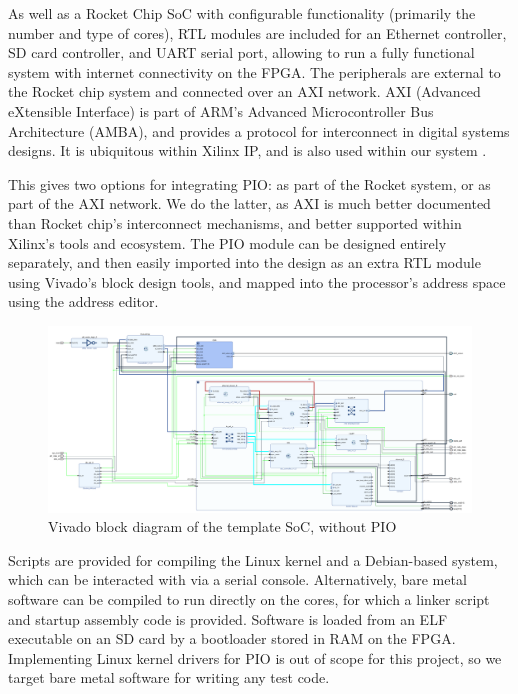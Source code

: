 As well as a Rocket Chip SoC with configurable functionality (primarily the number and type of cores), RTL modules are included for an Ethernet controller, SD card controller, and UART serial port, allowing to run a fully functional system with internet connectivity on the FPGA. The peripherals are external to the Rocket chip system and connected over an AXI network. AXI (Advanced eXtensible Interface) is part of ARM's Advanced Microcontroller Bus Architecture (AMBA), and provides a protocol for interconnect in digital systems designs. It is ubiquitous within Xilinx IP, and is also used within our system \cite{axi}.

This gives two options for integrating PIO: as part of the Rocket system, or as part of the AXI network. We do the latter, as AXI is much better documented than Rocket chip's interconnect mechanisms, and better supported within Xilinx's tools and ecosystem. The PIO module can be designed entirely separately, and then easily imported into the design as an extra RTL module using Vivado's block design tools, and mapped into the processor's address space using the address editor.

\begin{figure}[H]
    \centering
    \includegraphics[width=1\textwidth]{../img/block-design.png}
    \caption{Vivado block diagram of the template SoC, without PIO}
    \label{fig:vivado-bd}
\end{figure}

Scripts are provided for compiling the Linux kernel and a Debian-based system, which can be interacted with via a serial console. Alternatively, bare metal software can be compiled to run directly on the cores, for which a linker script and startup assembly code is provided. Software is loaded from an ELF executable on an SD card by a bootloader stored in RAM on the FPGA. Implementing Linux kernel drivers for PIO is out of scope for this project, so we target bare metal software for writing any test code.



